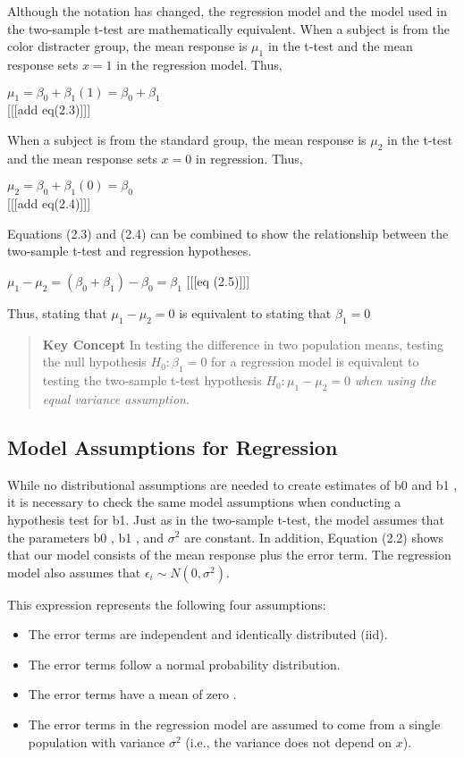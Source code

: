 \documentclass[
]{report}
\providecommand{\tightlist}{%
  \setlength{\itemsep}{0pt}\setlength{\parskip}{0pt}}
\begin{document}
Although the notation has changed, the regression model and the model used in the two-sample t-test are mathematically equivalent. When a subject is from the color distracter group, the mean response is \(\mu_1\) in the t-test and the mean response sets \(x = 1\) in the regression model. Thus,

\(\mu_1 = \beta_0 + \beta_1(1)  = \beta_0 + \beta_1\)\\
{[}{[}{[}add eq(2.3){]}{]}{]}

When a subject is from the standard group, the mean response is \(\mu_2\) in the t-test and the mean response sets \(x = 0\) in regression. Thus,

\(\mu_2 = \beta_0 + \beta_1(0)  = \beta_0\)\\
{[}{[}{[}add eq(2.4){]}{]}{]}

Equations (2.3) and (2.4) can be combined to show the relationship between the two-sample t-test and regression hypotheses.

\(\mu_1 - \mu_2 = (\beta_0 + \beta_1) -  \beta_0 = \beta_1\)
{[}{[}{[}eq (2.5){]}{]}{]}

Thus, stating that \(\mu_1 - \mu_2 = 0\) is equivalent to stating that \(\beta_1 = 0\)

\begin{quote}
\textbf{Key Concept}
In testing the difference in two population means, testing the null hypothesis \(H_0 : \beta_1 = 0\) for a regression model is equivalent to testing the two-sample t-test hypothesis \(H_0 : \mu_1 - \mu_2 = 0\) \emph{when using the equal variance assumption}.
\end{quote}

\subsection{Model Assumptions for Regression}\label{model-assumptions-for-regression}

While no distributional assumptions are needed to create estimates of b0 and b1 , it is necessary to check the same model assumptions when conducting a hypothesis test for b1. Just as in the two-sample t-test, the model assumes that the parameters b0 , b1 , and \(\sigma^2\) are constant. In addition, Equation (2.2) shows that our model consists of the mean response plus the error term. The regression model also assumes that \(\epsilon_i \sim N(0,\sigma^2)\).

This expression represents the following four assumptions:

\begin{itemize}
\tightlist
\item
  The error terms are independent and identically distributed (iid).
\item
  The error terms follow a normal probability distribution.
\item
  The error terms have a mean of zero .
\item
  The error terms in the regression model are assumed to come from a single population with variance \(\sigma^2\) (i.e., the variance does not depend on \(x\)).
\end{itemize}
\end{document}
